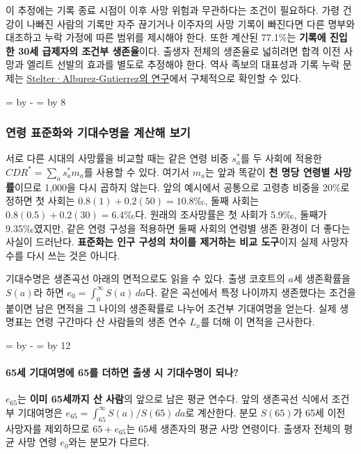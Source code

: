 \documentclass[10pt,a4paper]{article}
\newcommand{\ReserveQuestionSpace}{%
  \par\begingroup
  \dimen0=\pagegoal \advance\dimen0 by -\pagetotal
  \dimen2=\baselineskip \multiply\dimen2 by 12
  \ifdim\dimen0<\dimen2 \newpage\fi
  \endgroup}
\newcommand{\ReserveReadingSectionSpace}{%
  \par\begingroup
  \dimen0=\pagegoal \advance\dimen0 by -\pagetotal
  \dimen2=\baselineskip \multiply\dimen2 by 8
  \ifdim\dimen0<\dimen2 \newpage\fi
  \endgroup}
\begin{document}
이 추정에는 기록 종료 시점이 이후 사망 위험과 무관하다는 조건이 필요하다. 가령 건강이 나빠진 사람의 기록만 자주 끊기거나 이주자의 사망 기록이 빠진다면 다른 명부와 대조하고 누락 가정에 따른 범위를 제시해야 한다. 또한 계산된 77.1\%는 \textbf{기록에 진입한 30세 급제자의 조건부 생존율}이다. 출생자 전체의 생존율로 넓히려면 합격 이전 사망과 엘리트 선발의 효과를 별도로 추정해야 한다. 역사 족보의 대표성과 기록 누락 문제는 \href{https://doi.org/10.1073/pnas.2120455119}{Stelter·Alburez-Gutierrez의 연구}에서 구체적으로 확인할 수 있다.\par

\ReserveReadingSectionSpace
\subsubsection*{연령 표준화와 기대수명을 계산해 보기}

서로 다른 시대의 사망률을 비교할 때는 같은 연령 비중 $s_a^*$를 두 사회에 적용한 $CDR^*=\sum_a s_a^*m_a$를 사용할 수 있다. 여기서 $m_a$는 앞과 똑같이 \textbf{천 명당 연령별 사망률}이므로 1,000을 다시 곱하지 않는다. 앞의 예시에서 공통으로 고령층 비중을 20\%로 정하면 첫 사회는 $0.8(1)+0.2(50)=10.8$‰, 둘째 사회는 $0.8(0.5)+0.2(30)=6.4$‰다. 원래의 조사망률은 첫 사회가 5.9‰, 둘째가 9.35‰였지만, 같은 연령 구성을 적용하면 둘째 사회의 연령별 생존 환경이 더 좋다는 사실이 드러난다. \textbf{표준화는 인구 구성의 차이를 제거하는 비교 도구}이지 실제 사망자 수를 다시 쓰는 것은 아니다.\par

기대수명은 생존곡선 아래의 면적으로도 읽을 수 있다. 출생 코호트의 $a$세 생존확률을 $S(a)$라 하면 $e_0=\int_0^\infty S(a)\,da$다. 같은 곡선에서 특정 나이까지 생존했다는 조건을 붙이면 남은 면적을 그 나이의 생존확률로 나누어 조건부 기대여명을 얻는다. 실제 생명표는 연령 구간마다 산 사람들의 생존 연수 $L_x$를 더해 이 면적을 근사한다.\par

\ReserveQuestionSpace
\paragraph{65세 기대여명에 65를 더하면 출생 시 기대수명이 되나?}
$e_{65}$는 \textbf{이미 65세까지 산 사람}의 앞으로 남은 평균 연수다. 앞의 생존곡선 식에서 조건부 기대여명은 $e_{65}=\int_{65}^\infty S(a)/S(65)\,da$로 계산한다. 분모 $S(65)$가 65세 이전 사망자를 제외하므로 $65+e_{65}$는 65세 생존자의 평균 사망 연령이다. 출생자 전체의 평균 사망 연령 $e_0$와는 분모가 다르다.\par
\end{document}
